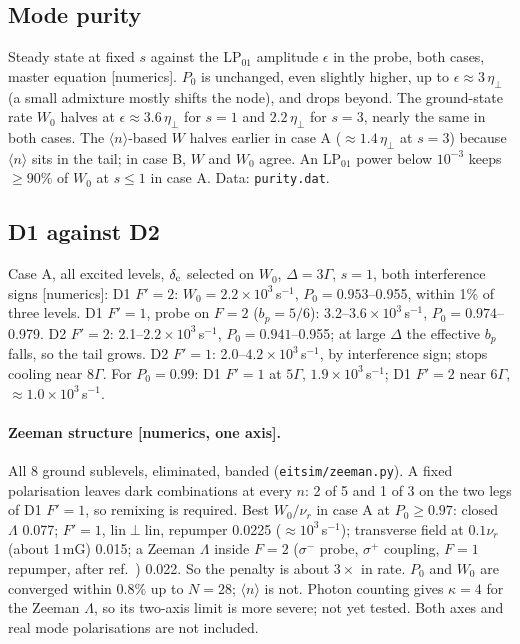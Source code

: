 \documentclass[11pt,a4paper]{article}
\newcommand{\etaeff}{\eta_{\perp}}
\begin{document}
\subsection{Mode purity}
\label{sec:purity}\hypertarget{d:purity}{}
Steady state at fixed $s$ against the LP$_{01}$ amplitude $\epsilon$ in the probe, both cases, master equation [numerics]. $P_0$ is unchanged, even slightly higher, up to $\epsilon\approx3\,\etaeff$ (a small admixture mostly shifts the node), and drops beyond. The ground-state rate $W_0$ halves at $\epsilon\approx3.6\,\etaeff$ for $s=1$ and $2.2\,\etaeff$ for $s=3$, nearly the same in both cases. The $\langle n\rangle$-based $W$ halves earlier in case A ($\approx1.4\,\etaeff$ at $s=3$) because $\langle n\rangle$ sits in the tail; in case B, $W$ and $W_0$ agree. An LP$_{01}$ power below $10^{-3}$ keeps $\ge90\%$ of $W_0$ at $s\le1$ in case A. Data: \texttt{purity.dat}.

\subsection{D1 against D2}
\hypertarget{d:lines}{}
Case A, all excited levels, $\delta_{\rm e}$ selected on $W_0$, $\Delta=3\Gamma$, $s=1$, both interference signs [numerics]: D1 $F'=2$: $W_0=2.2\times10^3\,$s$^{-1}$, $P_0=0.953$--0.955, within 1\% of three levels. D1 $F'=1$, probe on $F=2$ ($b_p=5/6$): 3.2--$3.6\times10^3\,$s$^{-1}$, $P_0=0.974$--0.979. D2 $F'=2$: 2.1--$2.2\times10^3\,$s$^{-1}$, $P_0=0.941$--0.955; at large $\Delta$ the effective $b_p$ falls, so the tail grows. D2 $F'=1$: 2.0--$4.2\times10^3\,$s$^{-1}$, by interference sign; stops cooling near $8\Gamma$. For $P_0=0.99$: D1 $F'=1$ at $5\Gamma$, $1.9\times10^3\,$s$^{-1}$; D1 $F'=2$ near $6\Gamma$, $\approx1.0\times10^3\,$s$^{-1}$. 

\paragraph{Zeeman structure [numerics, one axis].} All 8 ground sublevels, eliminated, banded (\texttt{eitsim/zeeman.py}). A fixed polarisation leaves dark combinations at every $n$: 2 of 5 and 1 of 3 on the two legs of D1 $F'=1$, so remixing is required. Best $W_0/\nu_r$ in case A at $P_0\ge0.97$: closed $\Lambda$ 0.077; $F'=1$, lin$\perp$lin, repumper 0.0225 ($\approx10^3\,$s$^{-1}$); transverse field at $0.1\nu_r$ (about 1\,mG) 0.015; a Zeeman $\Lambda$ inside $F=2$ ($\sigma^-$ probe, $\sigma^+$ coupling, $F=1$ repumper, after ref.~\cite{qiu2026}) 0.022. So the penalty is about $3\times$ in rate. $P_0$ and $W_0$ are converged within 0.8\% up to $N=28$; $\langle n\rangle$ is not. Photon counting gives $\kappa=4$ for the Zeeman $\Lambda$, so its two-axis limit is more severe; not yet tested. Both axes and real mode polarisations are not included.
\end{document}
